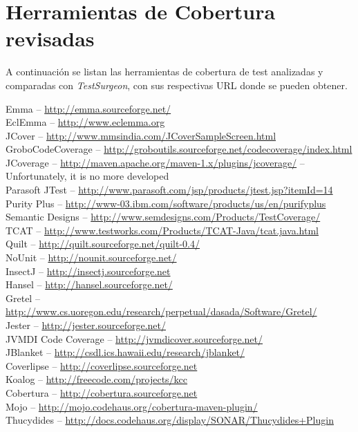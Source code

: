 \chapter{Herramientas de Cobertura revisadas}

\par A continuación se listan las herramientas de cobertura de test analizadas y comparadas con \emph{TestSurgeon}, con sus respectivas URL donde se pueden obtener.

\noindent Emma -- \url{http://emma.sourceforge.net/}\\
\noindent EclEmma -- \url{http://www.eclemma.org}\\
\noindent JCover -- \url{http://www.mmsindia.com/JCoverSampleScreen.html}\\
\noindent GroboCodeCoverage -- \url{http://groboutils.sourceforge.net/codecoverage/index.html}\\
\noindent JCoverage -- \url{http://maven.apache.org/maven-1.x/plugins/jcoverage/} -- Unfortunately, it is no more developed \\
\noindent Parasoft JTest -- \url{http://www.parasoft.com/jsp/products/jtest.jsp?itemId=14}\\
\noindent Purity Plus -- \url{http://www-03.ibm.com/software/products/us/en/purifyplus}\\
\noindent Semantic Designs -- \url{http://www.semdesigns.com/Products/TestCoverage/}\\
\noindent TCAT -- \url{http://www.testworks.com/Products/TCAT-Java/tcat.java.html}\\
\noindent Quilt -- \url{http://quilt.sourceforge.net/quilt-0.4/}\\
\noindent NoUnit -- \url{http://nounit.sourceforge.net/}\\
\noindent InsectJ -- \url{http://insectj.sourceforge.net}\\
\noindent Hansel -- \url{http://hansel.sourceforge.net/}\\
\noindent Gretel -- \url{http://www.cs.uoregon.edu/research/perpetual/dasada/Software/Gretel/}\\
\noindent Jester -- \url{http://jester.sourceforge.net/}\\
\noindent JVMDI Code Coverage -- \url{http://jvmdicover.sourceforge.net/}\\
\noindent JBlanket -- \url{http://csdl.ics.hawaii.edu/research/jblanket/}\\
\noindent Coverlipse -- \url{http://coverlipse.sourceforge.net}\\
\noindent Koalog -- \url{http://freecode.com/projects/kcc}\\
\noindent Cobertura -- \url{http://cobertura.sourceforge.net}\\
\noindent Mojo -- \url{http://mojo.codehaus.org/cobertura-maven-plugin/}\\
\noindent Thucydides -- \url{http://docs.codehaus.org/display/SONAR/Thucydides+Plugin}